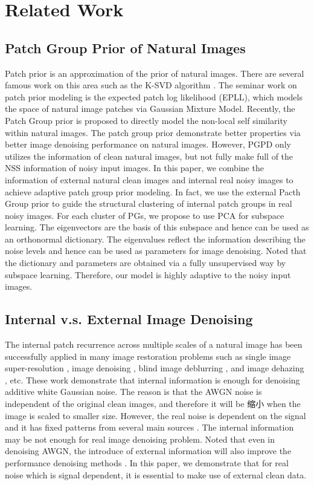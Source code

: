 \documentclass[10pt,twocolumn,letterpaper]{article}
\begin{document}
\section{Related Work}
\subsection{Patch Group Prior of Natural Images}
Patch prior is an approximation of the prior of natural images. There are several famous work on this area such as the K-SVD algorithm \cite{ksvd}. The seminar work on patch prior modeling is the expected patch log likelihood (EPLL), which models the space of natural image patches via Gaussian Mixture Model. Recently, the Patch Group prior \cite{pgpd} is proposed to directly model the non-local self similarity within natural images. The patch group prior demonstrate better properties via better image denoising performance on natural images. However, PGPD only utilizes the information of clean natural images, but not fully make full of the NSS information of noisy input images. In this paper, we combine the information of external natural clean images and internal real noisy images to achieve adaptive patch group prior modeling. In fact, we use the external Pacth Group prior to guide the structural clustering of internal patch groups in real noisy images. For each cluster of PGs, we propose to use PCA for subspace learning. The eigenvectors are the basis of this subspace and hence can be used as an orthonormal dictionary. The eigenvalues reflect the information describing the noise levels and hence can be used as parameters for image denoising. Noted that the dictionary and parameters are obtained via a fully unsupervised way by subspace learning. Therefore, our model is highly adaptive to the noisy input images.


\subsection{Internal v.s. External Image Denoising}
The internal patch recurrence across multiple scales of a natural image has been successfully applied in many image restoration problems such as single image super-resolution \cite{Irani2009sr}, image denoising \cite{Irani2013separating}, blind image deblurring \cite{Irani2014deblur}, and image dehazing \cite{Irani2016dehazing}, etc. These work demonstrate that internal information is enough for denoising additive white Gaussian noise. The reason is that the AWGN noise is independent of the original clean images, and therefore it will be 缩小 when the image is scaled to smaller size. However, the real noise is dependent on the signal \cite{crosschannel2016} and it has fixed patterns from several main sources \cite{healey1994radiometric}. The internal information may be not enough for real image denoising problem. Noted that even in denoising AWGN, the introduce of external information will also improve the performance denoising methods \cite{luo2015adaptive}. In this paper, we demonstrate that for real noise which is signal dependent, it is essential to make use of external clean data.
\end{document}
